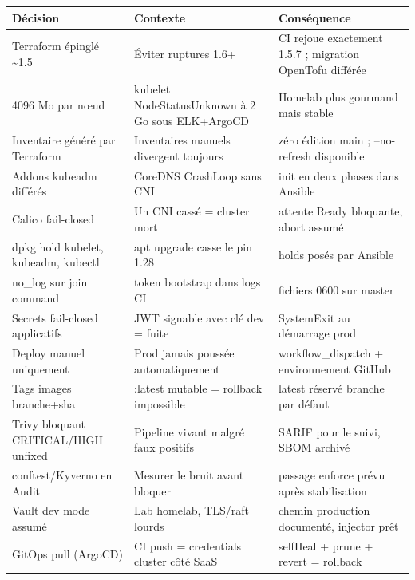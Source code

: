 \documentclass[12pt,a4paper,twoside,openright]{report}
\begin{document}
\begin{center}\label{tab:an-journal-des-decisions-extraits-adr}\end{center}
\begin{longtable}{@{}p{4.2cm}p{5.6cm}p{4.2cm}@{}}
\toprule
\textbf{Décision} & \textbf{Contexte} & \textbf{Conséquence} \\
\midrule
\endhead
Terraform épinglé \textasciitilde1.5 & Éviter ruptures 1.6+ & CI rejoue exactement 1.5.7 ; migration OpenTofu différée \\
4096 Mo par nœud & kubelet NodeStatusUnknown à 2 Go sous ELK+ArgoCD & Homelab plus gourmand mais stable \\
Inventaire généré par Terraform & Inventaires manuels divergent toujours & zéro édition main ; --no-refresh disponible \\
Addons kubeadm différés & CoreDNS CrashLoop sans CNI & init en deux phases dans Ansible \\
Calico fail-closed & Un CNI cassé = cluster mort & attente Ready bloquante, abort assumé \\
dpkg hold kubelet, kubeadm, kubectl & apt upgrade casse le pin 1.28 & holds posés par Ansible \\
no\_log sur join command & token bootstrap dans logs CI & fichiers 0600 sur master \\
Secrets fail-closed applicatifs & JWT signable avec clé dev = fuite & SystemExit au démarrage prod \\
Deploy manuel uniquement & Prod jamais poussée automatiquement & workflow\_dispatch + environnement GitHub \\
Tags images branche+sha & :latest mutable = rollback impossible & latest réservé branche par défaut \\
Trivy bloquant CRITICAL/HIGH unfixed & Pipeline vivant malgré faux positifs & SARIF pour le suivi, SBOM archivé \\
conftest/Kyverno en Audit & Mesurer le bruit avant bloquer & passage enforce prévu après stabilisation \\
Vault dev mode assumé & Lab homelab, TLS/raft lourds & chemin production documenté, injector prêt \\
GitOps pull (ArgoCD) & CI push = credentials cluster côté SaaS & selfHeal + prune + revert = rollback \\
\bottomrule
\end{longtable}

\end{document}
